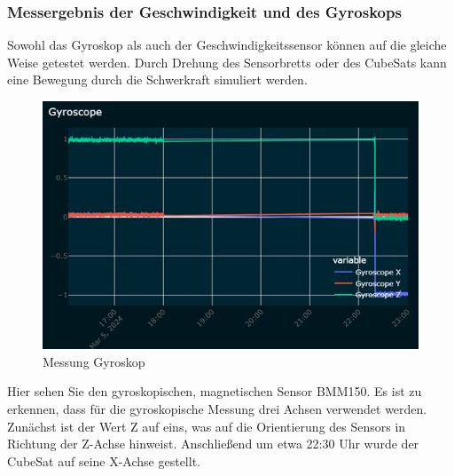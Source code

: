 \subsubsection{Messergebnis der Geschwindigkeit und des Gyroskops}
Sowohl das Gyroskop als auch der Geschwindigkeitssensor können auf die gleiche Weise getestet werden. Durch Drehung des Sensorbretts oder des CubeSats kann eine Bewegung durch die Schwerkraft simuliert werden.\\
\vspace{3mm}
\begin{figure}[H]
	\centering
	\includegraphics[scale=1]{image/messgyros.png}
	\caption{Messung Gyroskop}
	\label{fig:enter-label}
\end{figure}
\vspace{3mm}
Hier sehen Sie den gyroskopischen, magnetischen Sensor BMM150. Es ist zu erkennen, dass für die gyroskopische Messung drei Achsen verwendet werden. Zunächst ist der Wert Z auf eins, was auf die Orientierung des Sensors in Richtung der Z-Achse hinweist. Anschließend um etwa 22:30 Uhr wurde der CubeSat auf seine X-Achse gestellt.